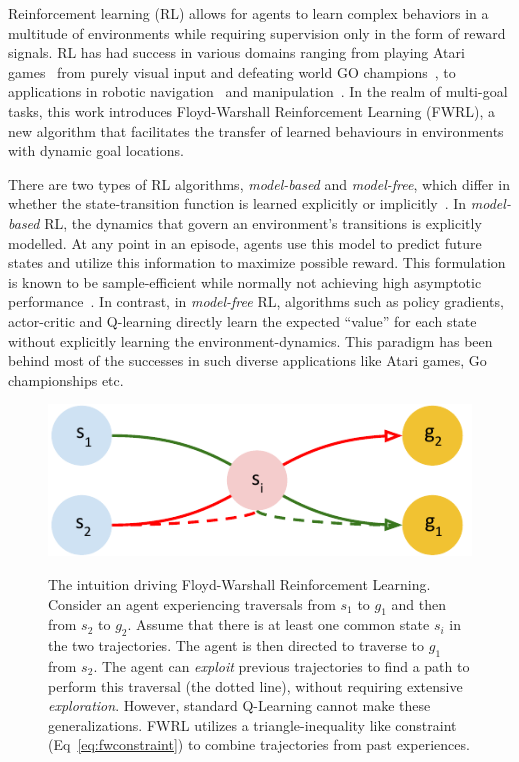 Reinforcement learning (RL) allows for agents to learn complex behaviors
in a multitude of environments while requiring supervision only in the
form of reward signals. RL has had success in various domains ranging
from playing Atari games~\citep{MnKaSiNATURE2015} from purely visual
input and defeating world GO champions~\citep{gibney2016google}, to
applications in robotic navigation~\citep{mirowski2018learning} and
manipulation~\cite{levine2018learning}. In the realm of multi-goal tasks,
this work introduces Floyd-Warshall Reinforcement Learning (FWRL), a new
algorithm that facilitates the transfer of learned behaviours in
environments with dynamic goal locations.


There are two types of RL algorithms, \emph{model-based} and
\emph{model-free}, which differ in whether the state-transition function
is learned explicitly or implicitly~\citep{SuBaBOOK1998}.  In
\emph{model-based} RL, the dynamics that govern an environment's
transitions is explicitly modelled.  At any point in an episode, agents
use this model to predict future states and utilize this information to
maximize possible reward. This formulation is known to be
sample-efficient while normally not achieving high asymptotic
performance~\citep{pong2018temporal}.  In contrast, in \emph{model-free}
RL, algorithms such as policy gradients, actor-critic and Q-learning
directly learn the expected ``value'' for each state without explicitly
learning the environment-dynamics. This paradigm has been behind most of
the successes in such diverse applications
like Atari games, Go championships etc.

\begin{figure}%
\includegraphics[width=\columnwidth]{./media/optimal_trajectories.pdf}\\
\caption{The intuition driving Floyd-Warshall Reinforcement Learning.
Consider an agent experiencing traversals from $s_1$ to $g_1$ and then from
$s_2$ to $g_2$. Assume that there is at least one common state $s_i$ in
the two trajectories. The agent is then directed to traverse to $g_1$ from
$s_2$. The agent can \emph{exploit} previous trajectories to find a path to
perform this traversal (the dotted line), without requiring extensive
\emph{exploration}. However, standard Q-Learning cannot
make these generalizations. FWRL utilizes a triangle-inequality like constraint
(Eq~\eqref{eq:fwconstraint}) to combine trajectories from past experiences.
}
\label{fig:ql-fw-grid-world-results}%
\end{figure}

